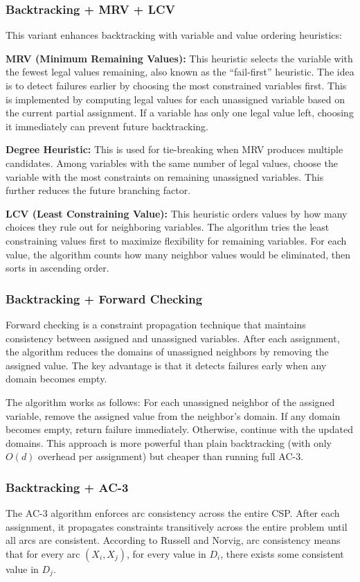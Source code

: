 \documentclass[letterpaper]{article}
\begin{document}
\subsubsection{Backtracking + MRV + LCV}
This variant enhances backtracking with variable and value ordering heuristics:

\textbf{MRV (Minimum Remaining Values):} This heuristic selects the variable with the fewest legal values remaining, also known as the ``fail-first'' heuristic. The idea is to detect failures earlier by choosing the most constrained variables first. This is implemented by computing legal values for each unassigned variable based on the current partial assignment. If a variable has only one legal value left, choosing it immediately can prevent future backtracking.

\textbf{Degree Heuristic:} This is used for tie-breaking when MRV produces multiple candidates. Among variables with the same number of legal values, choose the variable with the most constraints on remaining unassigned variables. This further reduces the future branching factor.

\textbf{LCV (Least Constraining Value):} This heuristic orders values by how many choices they rule out for neighboring variables. The algorithm tries the least constraining values first to maximize flexibility for remaining variables. For each value, the algorithm counts how many neighbor values would be eliminated, then sorts in ascending order.

\subsubsection{Backtracking + Forward Checking}
Forward checking is a constraint propagation technique that maintains consistency between assigned and unassigned variables. After each assignment, the algorithm reduces the domains of unassigned neighbors by removing the assigned value. The key advantage is that it detects failures early when any domain becomes empty.

The algorithm works as follows: For each unassigned neighbor of the assigned variable, remove the assigned value from the neighbor's domain. If any domain becomes empty, return failure immediately. Otherwise, continue with the updated domains. This approach is more powerful than plain backtracking (with only $O(d)$ overhead per assignment) but cheaper than running full AC-3.

\subsubsection{Backtracking + AC-3}
The AC-3 algorithm enforces arc consistency across the entire CSP. After each assignment, it propagates constraints transitively across the entire problem until all arcs are consistent. According to Russell and Norvig, arc consistency means that for every arc $(X_i, X_j)$, for every value in $D_i$, there exists some consistent value in $D_j$.
\end{document}
